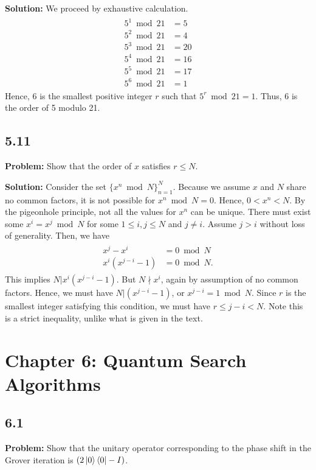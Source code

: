 \documentclass{article}
\begin{document}
\textbf{Solution:} We proceed by exhaustive calculation.
\begin{align}
\begin{aligned}
    5^1 \bmod 21 &= 5 \\
    5^2 \bmod 21 &= 4 \\
    5^3 \bmod 21 &= 20\\
    5^4 \bmod 21 &= 16\\
    5^5 \bmod 21 &= 17\\
    5^6 \bmod 21 &= 1
\end{aligned}
\end{align}
Hence, 6 is the smallest positive integer $r$ such that $5^r \bmod 21 = 1$. Thus, 6 is the order of 5 modulo 21.

\subsection*{5.11}
\textbf{Problem:} Show that the order of $x$ satisfies $r\leq N$.

\textbf{Solution:} Consider the set $\{x^n \bmod N\}_{n=1}^N$. Because we assume $x$ and $N$ share no common factors, it is not possible for $x^n \bmod N = 0$. Hence, $0< x^n < N$. By the pigeonhole principle, not all the values for $x^n$ can be unique. There must exist some $x^i = x^j \bmod N$ for some $1\leq i,j \leq N$ and $j\neq i$. Assume $j>i$ without loss of generality. Then, we have
\begin{align}
\begin{aligned}
    x^j-x^i &= 0 \bmod N \\
    x^i(x^{j-i}-1) &=0 \bmod N.
\end{aligned}
\end{align}
This implies $N|x^i(x^{j-i}-1)$. But $N\nmid x^i$, again by assumption of no common factors. Hence, we must have $N|(x^{j-i}-1)$, or $x^{j-i} = 1 \bmod N$. Since $r$ is the smallest integer satisfying this condition, we must have $r\leq j-i < N$. Note this is a strict inequality, unlike what is given in the text.
\section*{Chapter 6: Quantum Search Algorithms}
\subsection*{6.1} 
\textbf{Problem:} Show that the unitary operator corresponding to the phase shift in the Grover iteration is $(2\ket{0}\bra{0}-I)$.
\end{document}
